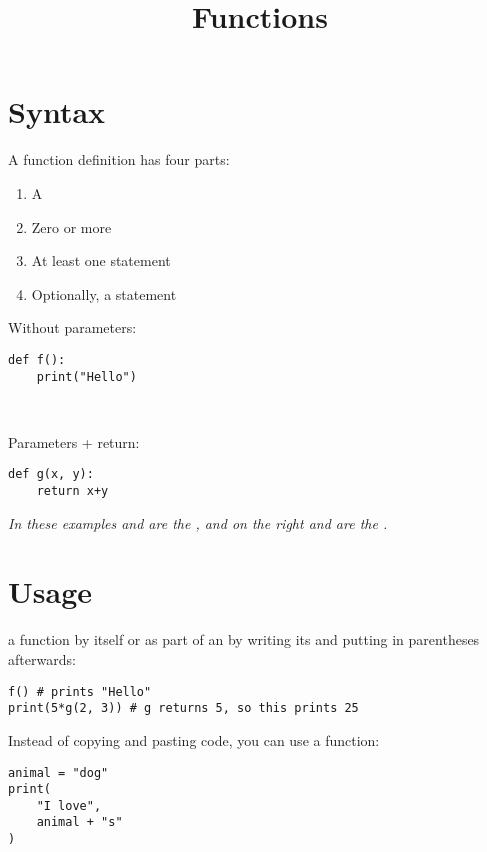 \documentclass{handout}
\title{Functions}
\begin{document}
\begin{multicols*}{2}

\section{Syntax}

A function definition has four parts:
\begin{enumerate}
\item A 
\item Zero or more 
\item At least one  statement
\item Optionally, a  statement
\end{enumerate}

\begin{minipage}[t]{0.42\columnwidth}
Without parameters:
\begin{lstlisting}
def f():
    print("Hello")
\end{lstlisting}
\end{minipage}
\begin{minipage}[t]{0.05\columnwidth}
\ 
\end{minipage}
\begin{minipage}[t]{0.42\columnwidth}
Parameters + return:
\begin{lstlisting}
def g(x, y):
    return x+y
\end{lstlisting}
\end{minipage}

\noindent
\textsl{In these examples  and  are the , and on the right  and  are the .}

\section{Usage}

 a function by itself or as part of an  by writing its  and putting  in parentheses afterwards:

\begin{lstlisting}
f() # prints "Hello"
print(5*g(2, 3)) # g returns 5, so this prints 25
\end{lstlisting}

Instead of copying and pasting code, you can use a function:

\begin{minipage}[t]{0.42\columnwidth}
\begin{lstlisting}
animal = "dog"
print(
    "I love",
    animal + "s"
)


\end{lstlisting}
\end{minipage}
\end{multicols*}
\end{document}
